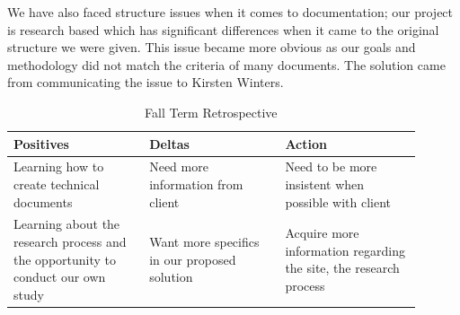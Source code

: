 \documentclass[onecolumn, draftclsnofoot,10pt, compsoc]{IEEEtran}
\begin{document}
We have also faced structure issues when it comes to documentation;  our project is research based which has significant differences when it came to the original structure we were given. This issue became more obvious as our goals and methodology did not match the criteria of many documents. The solution came from communicating the issue to Kirsten Winters. 

\clearpage
\begin{table}[]
\centering
\caption{Fall Term Retrospective}
\label{my-label}
\begin{tabular}{|p{0.3\linewidth}|p{0.3\linewidth}|p{0.3\linewidth}|}
\hline
Positives                                                                        & Deltas                                       & Action                                                            \\ \hline
Learning how to create technical documents                                       & Need more information from client            & Need to be more insistent when possible with client               \\ \hline
Learning about the research process and the opportunity to conduct our own study & Want more specifics in our proposed solution & Acquire more information regarding the site, the research process \\ \hline
\end{tabular}
\end{table}
\end{document}

